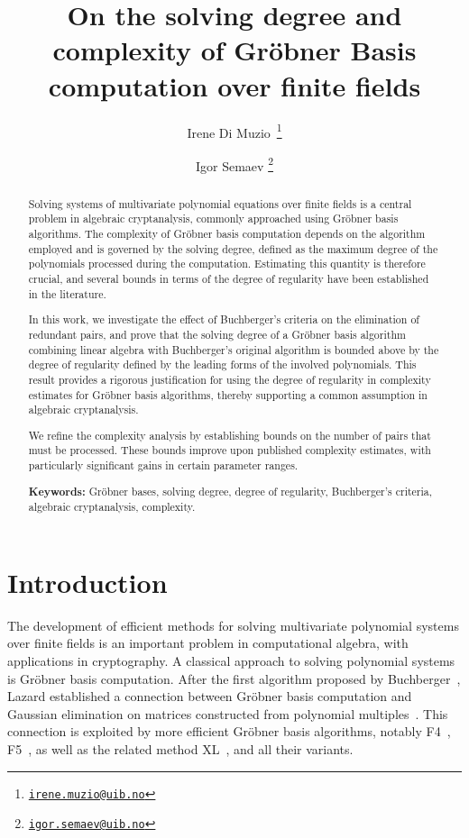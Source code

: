 \documentclass[a4paper, 12pt, oneside, openright]{article}
\title{On the solving degree and complexity of Gr\"obner Basis computation over finite fields}
\author{Irene Di Muzio\,\orcidlink{0009-0007-2549-1087}
\thanks{\href{mailto:irene.muzio@uib.no}
{\texttt{irene.muzio@uib.no}}}}
\author{Igor Semaev%
\thanks{\href{mailto:igor.semaev@uib.no}
{\texttt{igor.semaev@uib.no}}}}
\affil{Department of Informatics, University of Bergen, Norway}
\date{}
\begin{document}
\maketitle

\begin{abstract}
Solving systems of multivariate polynomial equations over finite fields is a central problem in algebraic cryptanalysis, commonly approached using Gröbner basis algorithms. The complexity of Gröbner basis computation depends on the algorithm employed and is governed by the solving degree, defined as the maximum degree of the polynomials processed during the computation. Estimating this quantity is therefore crucial, and several bounds in terms of the degree of regularity have been established in the literature.

In this work, we  investigate the effect of Buchberger's criteria on the elimination of redundant pairs, and  prove  that the solving degree of a Gröbner basis algorithm combining linear algebra with Buchberger's original algorithm is bounded above by the degree of regularity defined by the leading forms of the involved polynomials. This result provides a rigorous justification for using the degree of regularity in complexity estimates for Gröbner basis algorithms, thereby supporting a common assumption in algebraic cryptanalysis.

We  refine the complexity analysis by establishing bounds on the number of pairs that must be processed. These bounds improve upon published complexity estimates, with particularly significant gains in certain parameter ranges.

\medskip
\noindent\textbf{Keywords:}
Gr\"obner bases, solving degree, degree of regularity, Buchberger's criteria, algebraic cryptanalysis, complexity.
\end{abstract}

\section{Introduction}\label{sec:intro}
The development of efficient methods for solving multivariate polynomial systems over finite fields is an important problem in computational algebra, with applications in  cryptography.
A classical approach to solving polynomial systems is Gr\"obner basis computation. After the first algorithm proposed by Buchberger~\cite{B65}, Lazard established a connection between Gr\"obner basis computation and Gaussian elimination on matrices constructed from polynomial multiples~\cite{L83}.
This connection is exploited by more efficient Gr\"obner basis algorithms, notably F4~\cite{F4}, F5~\cite{F5}, as well as the related method XL~\cite{XL}, and all their variants.
\end{document}
